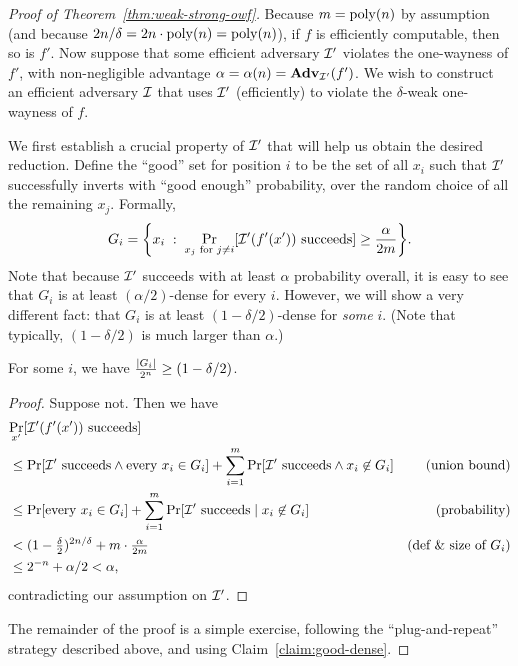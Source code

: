 \documentclass[11pt]{article}
\begin{document}
\begin{proof}[Proof of Theorem~\ref{thm:weak-strong-owf}]
  Because $m = \operatorname{poly}(n)$ by assumption (and because $2n/\delta = 2n
  \cdot \operatorname{poly}(n) = \operatorname{poly}(n)$), if $f$ is efficiently computable, then
  so is $f'$.  Now suppose that some efficient adversary $\mathcal{I}'$
  violates the one-wayness of $f'$, with non-negligible advantage
  $\alpha = \alpha(n) = \mathbf{Adv}_{\mathcal{I}'}(f')$.  We wish to construct an
  efficient adversary $\mathcal{I}$ that uses $\mathcal{I}'$ (efficiently) to
  violate the $\delta$-weak one-wayness of $f$.

  We first establish a crucial property of $\mathcal{I}'$ that will help us
  obtain the desired reduction.  Define the ``good'' set for position
  $i$ to be the set of all $x_{i}$ such that $\mathcal{I}'$ successfully
  inverts with ``good enough'' probability, over the random choice of
  all the remaining $x_{j}$.  Formally, \[ G_{i} = \set*{ x_{i}\;
    :\; \Pr_{x_{j} \text{ for } j \neq i} \bracks*{ \Inv'(f'(x'))
      \text{ succeeds} } \geq \frac{\alpha}{2m}}. \] Note that because
  $\mathcal{I}'$ succeeds with at least $\alpha$ probability overall, it is
  easy to see that $G_{i}$ is at least $(\alpha/2)$-dense for every
  $i$.  However, we will show a very different fact: that $G_{i}$ is
  at least $(1-\delta/2)$-dense for \emph{some} $i$.  (Note that
  typically, $(1-\delta/2)$ is much larger than $\alpha$.)

  \begin{claim}
    \label{claim:good-dense}
    For some $i$, we have $\frac{\lvert G_{i}\rvert}{2^{n}} \geq
    (1-\delta/2)$.
  \end{claim}

  \begin{proof}
    Suppose not.  Then we have
    \begin{align*}
      \lefteqn{\Pr_{x'}[\Inv'(f'(x')) \text{ succeeds]}} \\
      &\leq \Pr[\Inv' \text{ succeeds} \wedge \text{every } x_{i} \in
      G_{i}] + \sum_{i=1}^{m} \Pr[\Inv' \text{ succeeds} \wedge
      x_{i} \not\in G_{i}] & \text{(union bound)} \\
      &\leq \Pr[\text{every } x_{i} \in G_{i}] + \sum_{i=1}^{m}
      \Pr[\Inv' \text{ succeeds}\; |\; x_{i} \not\in
      G_{i}] & \text{(probability)} \\
      &< (1-\tfrac{\delta}{2})^{2n/\delta} + m \cdot \tfrac{\alpha}{2m}
      & \text{(def \& size of $G_{i}$)} \\
      &\leq 2^{-n} + \alpha/2 < \alpha,
    \end{align*}
    contradicting our assumption on $\mathcal{I}'$.
  \end{proof}

  The remainder of the proof is a simple exercise, following the
  ``plug-and-repeat'' strategy described above, and using
  Claim~\ref{claim:good-dense}.
\end{proof}
\end{document}
